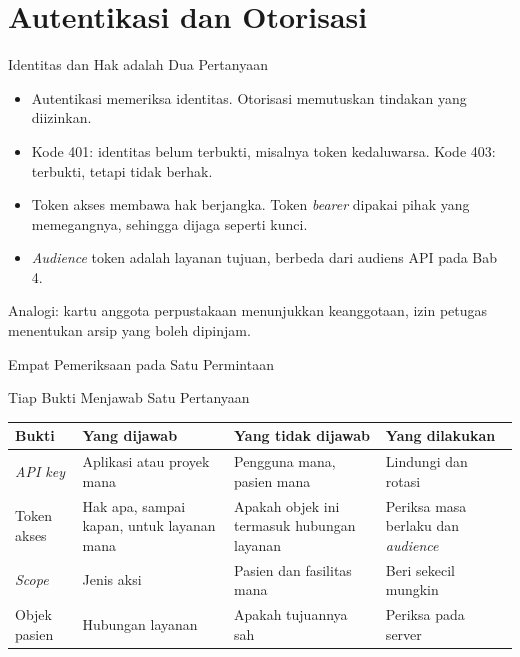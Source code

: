 \documentclass[aspectratio=169, table, 12pt]{beamer}
\begin{document}
\section{Autentikasi dan Otorisasi}

\begin{frame}{{\Large Identitas dan Hak adalah Dua Pertanyaan}}
  \vspace{10pt}
  \begin{itemize}
    \item Autentikasi memeriksa identitas. Otorisasi memutuskan tindakan yang diizinkan.
    \item Kode 401: identitas belum terbukti, misalnya token kedaluwarsa. Kode 403: terbukti, tetapi tidak berhak.
    \item Token akses membawa hak berjangka. Token \textit{bearer} dipakai pihak yang memegangnya, sehingga dijaga seperti kunci.
    \item \textit{Audience} token adalah layanan tujuan, berbeda dari audiens API pada Bab 4.
  \end{itemize}
  \vspace{6pt}
  {\small Analogi: kartu anggota perpustakaan menunjukkan keanggotaan, izin petugas menentukan arsip yang boleh dipinjam.}
\end{frame}

\begin{frame}{{\Large Empat Pemeriksaan pada Satu Permintaan}}
  \centering
\end{frame}

\begin{frame}{{\Large Tiap Bukti Menjawab Satu Pertanyaan}}
  \small
  \begin{tabularx}{\textwidth}{>{\raggedright\arraybackslash}p{1.9cm}
      >{\raggedright\arraybackslash}X >{\raggedright\arraybackslash}X >{\raggedright\arraybackslash}p{2.6cm}}
    \hline
    \textbf{Bukti} & \textbf{Yang dijawab} & \textbf{Yang tidak dijawab} & \textbf{Yang dilakukan} \\ \hline
    \textit{API key} & Aplikasi atau proyek mana & Pengguna mana, pasien mana & Lindungi dan rotasi \\ \hline
    Token akses & Hak apa, sampai kapan, untuk layanan mana & Apakah objek ini termasuk hubungan layanan & Periksa masa berlaku dan \textit{audience} \\ \hline
    \textit{Scope} & Jenis aksi & Pasien dan fasilitas mana & Beri sekecil mungkin \\ \hline
    Objek pasien & Hubungan layanan & Apakah tujuannya sah & Periksa pada server \\ \hline
  \end{tabularx}
\end{frame}
\end{document}
